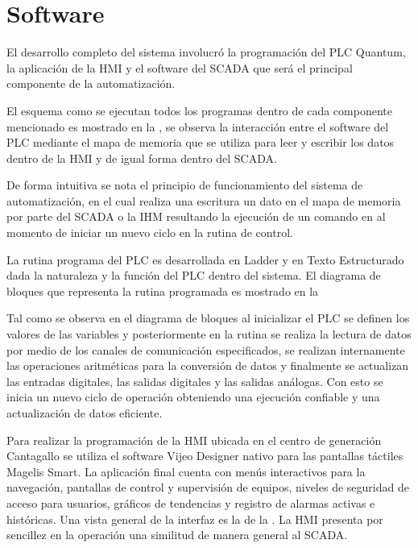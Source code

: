 
\section{Software}

El desarrollo completo del sistema involucró la programación del PLC Quantum, la aplicación de la HMI y el software del SCADA que será el principal componente de la automatización.

El esquema como se ejecutan todos los programas dentro de cada componente mencionado es mostrado en la , se observa la interacción entre el software del PLC mediante el mapa de memoria  que se utiliza para leer y escribir los datos dentro de la HMI y de igual forma dentro del SCADA.

De forma intuitiva se nota el principio de funcionamiento del sistema de automatización, en el cual realiza una escritura un dato en el mapa de memoria por parte del SCADA o la IHM resultando la ejecución de un comando en al momento de iniciar un nuevo ciclo en la rutina de control.


La rutina programa del PLC es desarrollada en Ladder y en Texto Estructurado dada la naturaleza y la función del PLC dentro del sistema. El diagrama de bloques que representa la rutina programada es mostrado en la %

Tal como se observa en el diagrama de bloques al inicializar el PLC se definen los valores de las variables y posteriormente en la rutina se realiza la lectura de datos por medio de los canales de comunicación especificados, se realizan internamente las operaciones aritméticas para la conversión de datos y finalmente se actualizan las entradas digitales, las salidas digitales y las salidas análogas. Con esto se inicia un nuevo ciclo de operación obteniendo una ejecución confiable y una actualización de datos eficiente.

Para realizar la programación de la HMI ubicada en el centro de generación Cantagallo se utiliza el software Vijeo Designer nativo para las pantallas táctiles Magelis Smart. La aplicación final cuenta con menús interactivos para la navegación, pantallas de control y supervisión de equipos, niveles de seguridad de acceso para usuarios, gráficos de tendencias y registro de alarmas activas e históricas. Una vista general de la interfaz es la de la . La HMI presenta por sencillez en la operación una similitud de manera general al SCADA.

